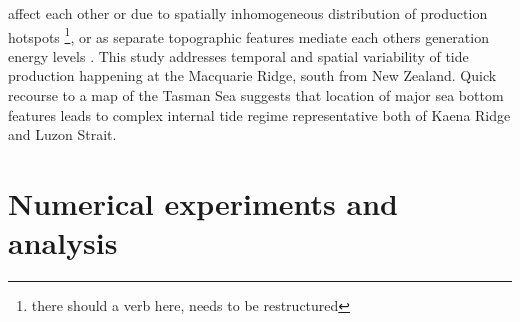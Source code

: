 \documentclass[12pt]{article}
\begin{document}
affect each other \citep{nash2004internal, zilberman2011incoherent, echeverri2010internal} or due 
to spatially inhomogeneous distribution of production hotspots \citep{osborne2011spatial, 
ponte2013coastal}\footnote{there should a verb here, needs to be restructured}, or as separate 
topographic features mediate each others generation energy levels \citep{xing1998three, 
buijsman2012modeling, buijsman2014three}. This study addresses temporal and spatial variability of 
tide production happening at the Macquarie Ridge, south from New Zealand. Quick recourse to a map 
of 
the 
Tasman Sea  suggests that location of major sea bottom features leads to 
complex internal tide regime representative both of Kaena Ridge and Luzon Strait.\\

\newpage

\section{Numerical experiments and analysis}
\end{document}

